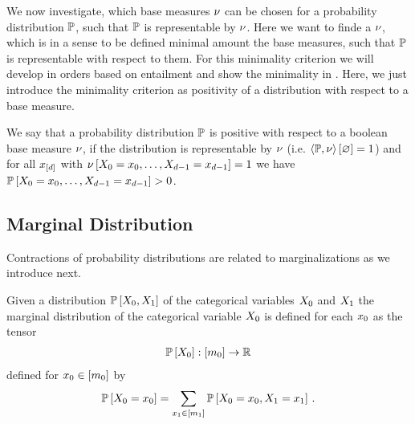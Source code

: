 We now investigate, which base measures $\nu$ can be chosen for a probability distribution $\mathbb{P}$, such that $\mathbb{P}$ is representable by $\nu$.
Here we want to finde a $\nu$, which is in a sense to be defined minimal amount the base measures, such that $\mathbb{P}$ is representable with respect to them.
For this minimality criterion we will develop in  orders based on entailment and show the minimality in .
Here, we just introduce the minimality criterion as positivity of a distribution with respect to a base measure.

\begin{definition}\label{def:positivityBaseMeasure}
	We say that a probability distribution $\mathbb{P}$ is positive with respect to a boolean base measure $\nu$, if the distribution is representable by $\nu$ (i.e. $\left\langle \mathbb{P},\nu\right\rangle \left[ \varnothing \right]=1$) and for all $x_{[d]}$ with $\nu\left[X_{0}=x_{0},\ldots,X_{d-1}=x_{d-1}\right]=1$ we have $\mathbb{P}\left[X_{0}=x_{0},\ldots,X_{d-1}=x_{d-1}\right]>0$.
\end{definition}



\subsection{Marginal Distribution}

Contractions of probability distributions are related to marginalizations as we introduce next.

\begin{definition}\label{def:marginalProbability}
	Given a distribution $\mathbb{P}\left[X_{0},X_{1}\right]$ of the categorical variables $X_{0}$ and $X_{1}$ the marginal distribution of the categorical variable $X_{0}$ is defined for each $x_{0}$ as the tensor
	\begin{align*}
		\mathbb{P}\left[X_{0}\right] : [m_{0}] \rightarrow \mathbb{R}
	\end{align*}
	defined for $x_{0}\in[m_{0}]$ by
	\begin{align*}
		\mathbb{P}\left[X_{0}=x_{0}\right] 
		= \sum_{x_{1}\in[m_{1}]} \mathbb{P}\left[X_{0}=x_{0},X_{1}=x_{1}\right] \, .
	\end{align*}
\end{definition}


